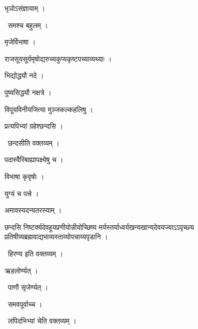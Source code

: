 \documentclass[10pt, openany, oneside]{book}
\begin{document}
\noindent भृञोऽसंज्ञायाम् ।

\par\noindent\hspace{1.5em}{\vps वा॰}~{\qt समश्च बहुलम् ।}

\noindent मृजेर्विभाषा ।

\noindent राजसूयसूर्यमृषोद्यरुच्यकुप्यकृष्टपच्याव्यथ्याः ।

\noindent भिद्योद्ध्यौ नदे ।

\noindent पुष्यसिद्ध्यौ नक्षत्रे ।

\noindent विपूयविनीयजित्या मुञ्जकल्कहलिषु ।

\noindent प्रत्यपिभ्यां ग्रहेश्छन्दसि ।

\par\noindent\hspace{1.5em}{\vps वा॰}~{\qt छन्दसीति वक्तव्यम् ।}

\noindent पदास्वैरिबाह्यापक्ष्येषु च ।

\noindent विभाषा कृवृषोः ।

\noindent युग्यं च पत्त्रे ।

\noindent अमावस्यदन्यतरस्याम् ।

\noindent छन्दसि निष्टर्क्यदेवहूयप्रणीयोन्नीयोच्छिष्य मर्यस्तर्याध्वर्यखन्यखान्यदेवयज्याऽऽपृच्छ्य प्रतिषीव्यब्रह्मवाद्यभाव्यस्ताव्योपचाय्यपृडानि ।

\par\noindent\hspace{1.5em}{\vps वा॰}~{\qt हिरण्य इति वक्तव्यम् ।}

\noindent ऋहलोर्ण्यत् ।

\par\noindent\hspace{1.5em}{\vps वा॰}~{\qt पाणौ सृजेर्ण्यत् ।}

\par\noindent\hspace{1.5em}{\vps वा॰}~{\qt समवपूर्वाच्च ।}

\par\noindent\hspace{1.5em}{\vps वा॰}~{\qt लपिदभिभ्यां चेति वक्तव्यम् ।}
\end{document}
